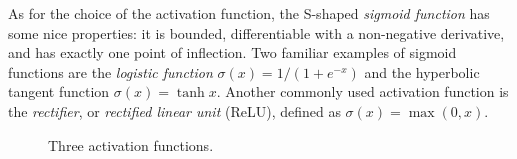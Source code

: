 \documentclass[a4paper,11pt,titlepage]{article}
\theoremstyle{definition}
\theoremstyle{plain}
\theoremstyle{remark}
\begin{document}
As for the choice of the activation function, the S-shaped \textit{sigmoid function} has some nice properties: it is bounded, differentiable with a non-negative derivative, and has exactly one point of inflection. Two familiar examples of sigmoid functions are the \textit{logistic function} $\sigma(x)=1/\left(1+e^{-x}\right)$ and the hyperbolic tangent function $\sigma(x)=\tanh x$. Another commonly used activation function is the \textit{rectifier}, or \textit{rectified linear unit} (ReLU), defined as $\sigma(x)=\max(0, x)$.

\begin{figure}[htbp]
    \centering
    \begin{minipage}{0.32\textwidth}
        \centering
    \end{minipage}%
    \hfill
    \begin{minipage}{0.32\textwidth}
        \centering
    \end{minipage}%
    \hfill
    \begin{minipage}{0.32\textwidth}
        \centering
    \end{minipage}
    \centering
    \caption{Three activation functions.}
\end{figure}
\end{document}

